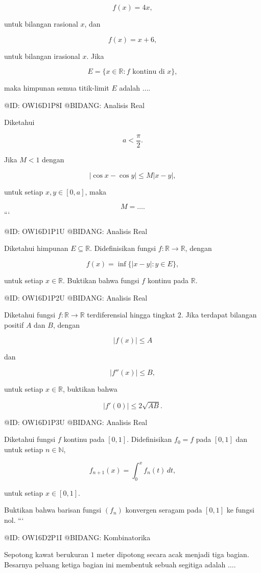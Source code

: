 $$
f(x)=4x,
$$

untuk bilangan rasional $x$, dan

$$
f(x)=x+6,
$$

untuk bilangan irasional $x$. Jika

$$
E=\{x\in\mathbb R:f \text{ kontinu di }x\},
$$

maka himpunan semua titik-limit $E$ adalah $\ldots$.

@ID: OW16D1P8I
@BIDANG: Analisis Real

Diketahui

$$
a<\frac{\pi}{2}.
$$

Jika $M<1$ dengan

$$
|\cos x-\cos y|\le M|x-y|,
$$

untuk setiap $x,y\in[0,a]$, maka

$$
M=\ldots.
$$
```

@ID: OW16D1P1U
@BIDANG: Analisis Real

Diketahui himpunan $E\subseteq\mathbb R$. Didefinisikan fungsi $f:\mathbb R\to\mathbb R$, dengan

$$
f(x)=\inf\{|x-y|:y\in E\},
$$

untuk setiap $x\in\mathbb R$. Buktikan bahwa fungsi $f$ kontinu pada $\mathbb R$.

@ID: OW16D1P2U
@BIDANG: Analisis Real

Diketahui fungsi $f:\mathbb R\to\mathbb R$ terdiferensial hingga tingkat $2$. Jika terdapat bilangan positif $A$ dan $B$, dengan

$$
|f(x)|\le A
$$

dan

$$
|f''(x)|\le B,
$$

untuk setiap $x\in\mathbb R$, buktikan bahwa

$$
|f'(0)|\le 2\sqrt{AB}.
$$

@ID: OW16D1P3U
@BIDANG: Analisis Real

Diketahui fungsi $f$ kontinu pada $[0,1]$. Didefinisikan $f_0=f$ pada $[0,1]$ dan untuk setiap $n\in\mathbb N$,

$$
f_{n+1}(x)=\int_0^x f_n(t)\,dt,
$$

untuk setiap $x\in[0,1]$.

Buktikan bahwa barisan fungsi $(f_n)$ konvergen seragam pada $[0,1]$ ke fungsi nol.
```

@ID: OW16D2P1I
@BIDANG: Kombinatorika

Sepotong kawat berukuran $1$ meter dipotong secara acak menjadi tiga bagian. Besarnya peluang ketiga bagian ini membentuk sebuah segitiga adalah $\ldots$.

